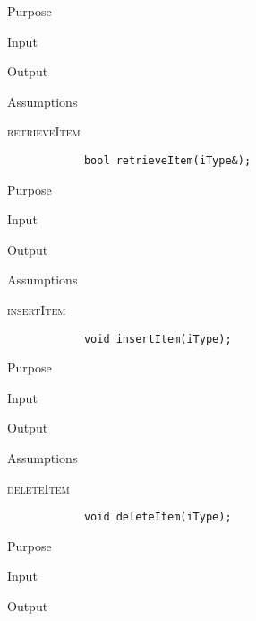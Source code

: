 \documentclass[pdftex, 12pt]{article}
\begin{document}
\begin{description}
\begin{description}
			\item{Purpose}

			\item{Input}

			\item{Output}

			\item{Assumptions}

		\end{description}
	\item{\textsc{retrieveItem}}
		\begin{lstlisting}
			bool retrieveItem(iType&);
		\end{lstlisting}
		\begin{description}

			\item{Purpose}

			\item{Input}

			\item{Output}

			\item{Assumptions}

		\end{description}
	\item{\textsc{insertItem}}
		\begin{lstlisting}
			void insertItem(iType);
		\end{lstlisting}
		\begin{description}

			\item{Purpose}

			\item{Input}

			\item{Output}

			\item{Assumptions}

		\end{description}
	\item{\textsc{deleteItem}}
		\begin{lstlisting}
			void deleteItem(iType);
		\end{lstlisting}
		\begin{description}

			\item{Purpose}

			\item{Input}

			\item{Output}


\end{description}
\end{description}
\end{document}
